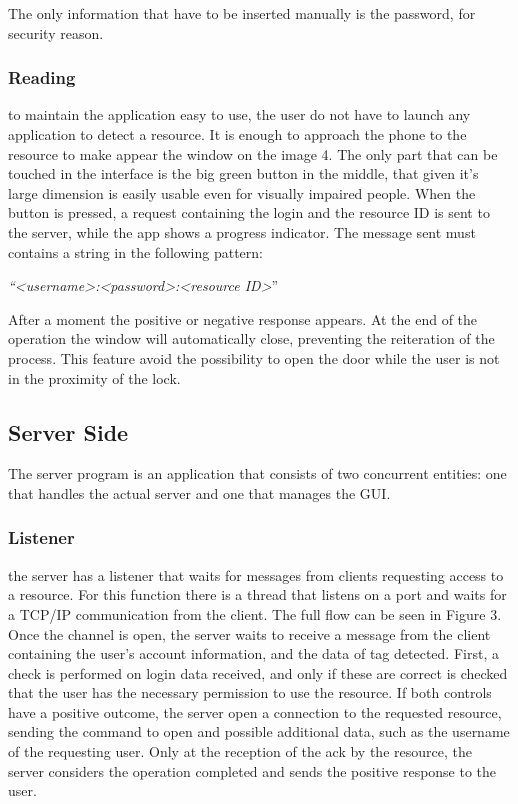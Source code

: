 \documentclass[conference]{IEEEtran}
\begin{document}
 The only information that have to be inserted manually is the password, for security reason.

\subsubsection{Reading}

to maintain the application easy to use, the user do not have to launch any application to detect a resource. It is enough to approach the phone to the resource to make appear the window on the image 4. The only part that can be touched in the interface is the big green button in the middle, that given it’s large dimension is easily usable even for visually impaired people. When the button is pressed, a request containing the login and the resource ID is sent to the server, while the app shows a progress indicator. The message sent must contains a string in the following pattern:
\begin{center}
\textit{``\textless username\textgreater :\textless password\textgreater :\textless resource ID\textgreater}''
\end{center}
 After a moment the positive or negative response appears. At the end of the operation the window will automatically close, preventing the reiteration of the process. This feature avoid the possibility to open the door while the user is not in the proximity of the lock.

\subsection{Server Side}

The server program is an application that consists of two concurrent entities: one that handles the actual server and one that manages the GUI.

\subsubsection{Listener}

\label{serverCheck}
the server has a listener that waits for messages from clients requesting access to a resource. For this function there is a thread that listens on a port and waits for a TCP/IP communication from the client. The full flow can be seen in Figure 3.
Once the channel is open, the server waits to receive a message from the client containing the user's account information, and the data of tag detected. First, a check is performed on login data received, and only if these are correct is checked that the user has the necessary permission to use the resource. If both controls have a positive outcome, the server open a connection to the requested resource, sending the command to open and possible additional data, such as the username of the requesting user. Only at the reception of the ack by the resource, the server considers the operation completed and sends the positive response to the user.
\end{document}
